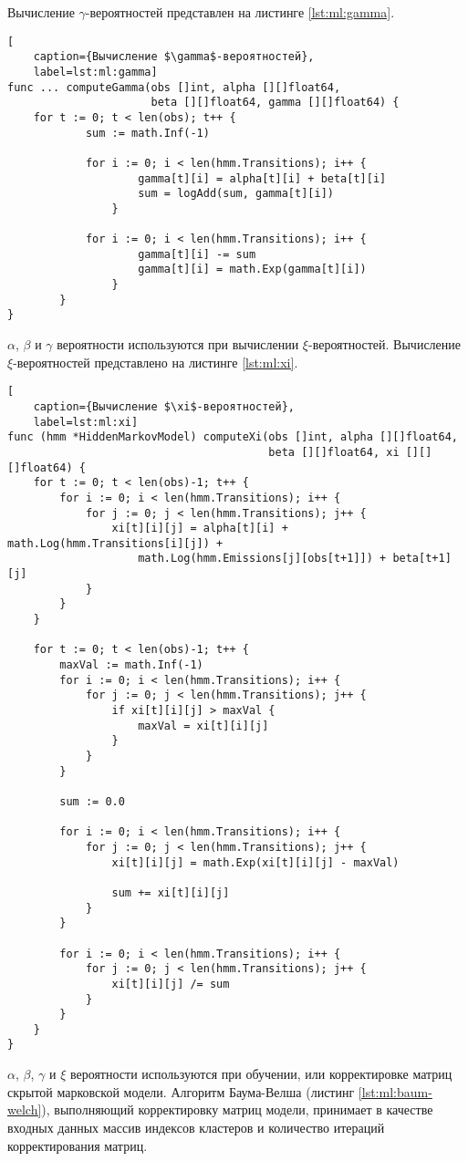 Вычисление $\gamma$-вероятностей представлен на листинге \ref{lst:ml:gamma}.
\begin{lstlisting}[
	caption={Вычисление $\gamma$-вероятностей},
	label=lst:ml:gamma]
func ... computeGamma(obs []int, alpha [][]float64, 
					  beta [][]float64, gamma [][]float64) {
	for t := 0; t < len(obs); t++ {
			sum := math.Inf(-1)
			
			for i := 0; i < len(hmm.Transitions); i++ {
					gamma[t][i] = alpha[t][i] + beta[t][i]
					sum = logAdd(sum, gamma[t][i])
				}
			
			for i := 0; i < len(hmm.Transitions); i++ {
					gamma[t][i] -= sum
					gamma[t][i] = math.Exp(gamma[t][i])
				}
		}
}
\end{lstlisting}
$\alpha$, $\beta$ и $\gamma$ вероятности используются при вычислении $\xi$-вероятностей. Вычисление $\xi$-вероятностей представлено на листинге  \ref{lst:ml:xi}.
\begin{lstlisting}[
	caption={Вычисление $\xi$-вероятностей},
	label=lst:ml:xi]
func (hmm *HiddenMarkovModel) computeXi(obs []int, alpha [][]float64, 
										beta [][]float64, xi [][][]float64) {
	for t := 0; t < len(obs)-1; t++ {
		for i := 0; i < len(hmm.Transitions); i++ {
			for j := 0; j < len(hmm.Transitions); j++ {
				xi[t][i][j] = alpha[t][i] + math.Log(hmm.Transitions[i][j]) +
					math.Log(hmm.Emissions[j][obs[t+1]]) + beta[t+1][j]
			}
		}
	}
	
	for t := 0; t < len(obs)-1; t++ {
		maxVal := math.Inf(-1)
		for i := 0; i < len(hmm.Transitions); i++ {
			for j := 0; j < len(hmm.Transitions); j++ {
				if xi[t][i][j] > maxVal {
					maxVal = xi[t][i][j]
				}
			}
		}
		
		sum := 0.0
		
		for i := 0; i < len(hmm.Transitions); i++ {
			for j := 0; j < len(hmm.Transitions); j++ {
				xi[t][i][j] = math.Exp(xi[t][i][j] - maxVal)
				
				sum += xi[t][i][j]
			}
		}
		
		for i := 0; i < len(hmm.Transitions); i++ {
			for j := 0; j < len(hmm.Transitions); j++ {
				xi[t][i][j] /= sum
			}
		}
	}
}
\end{lstlisting}
$\alpha$, $\beta$, $\gamma$ и $\xi$ вероятности используются при обучении, или корректировке матриц скрытой марковской модели. Алгоритм Баума-Велша (листинг \ref{lst:ml:baum-welch}), выполняющий корректировку матриц модели, принимает в качестве входных данных массив индексов кластеров и количество итераций корректирования матриц. 
